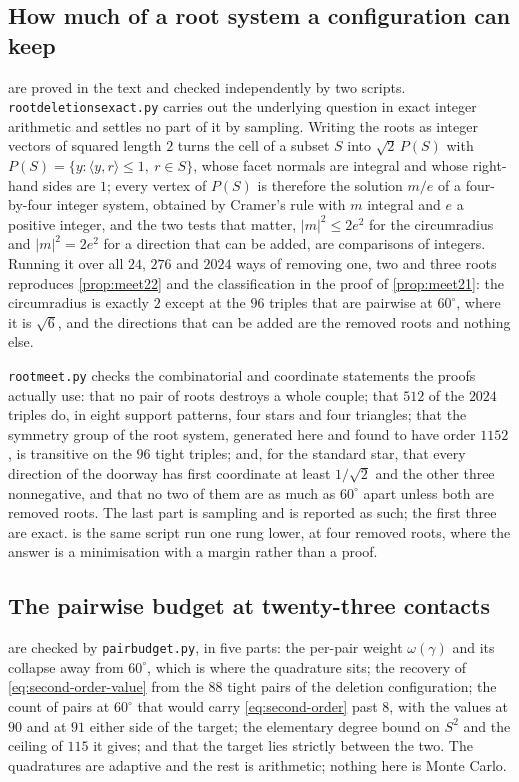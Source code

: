 \documentclass[11pt,reqno]{amsart}
\renewcommand{\_}{\origunderscore\allowbreak}
\numberwithin{equation}{section}
\theoremstyle{plain}
\theoremstyle{definition}
\theoremstyle{remark}
\begin{document}
\subsection*{How much of a root system a configuration can keep}

 are proved in the text and checked
independently by two scripts. \texttt{root\_deletions\_exact.py} carries
out the underlying question in exact integer arithmetic and settles no
part of it by sampling. Writing the roots as integer vectors of squared
length $2$ turns the cell of a subset $S$ into $\sqrt2\,P(S)$ with
$P(S)=\{y:\langle y,r\rangle\le1,\ r\in S\}$, whose facet normals are
integral and whose right-hand sides are $1$; every vertex of $P(S)$ is
therefore the solution $m/e$ of a four-by-four integer system, obtained
by Cramer's rule with $m$ integral and $e$ a positive integer, and the
two tests that matter, $|m|^2\le2e^2$ for the circumradius and
$|m|^2=2e^2$ for a direction that can be added, are comparisons of
integers. Running it over all $24$, $276$ and $2024$ ways of removing
one, two and three roots reproduces \cref{prop:meet22} and the
classification in the proof of \cref{prop:meet21}: the circumradius is
exactly $2$ except at the $96$ triples that are pairwise at $60^\circ$,
where it is $\sqrt6$, and the directions that can be added are the
removed roots and nothing else.

\texttt{root\_meet.py} checks the combinatorial and coordinate
statements the proofs actually use: that no pair of roots destroys a
whole couple; that $512$ of the $2024$ triples do, in eight support
patterns, four stars and four triangles; that the symmetry group of the
root system, generated here and found to have order $1152$, is
transitive on the $96$ tight triples; and, for the standard star, that
every direction of the doorway has first coordinate at least $1/\sqrt2$
and the other three nonnegative, and that no two of them are as much as
$60^\circ$ apart unless both are removed roots. The last part is
sampling and is reported as such; the first three are exact.
 is the same script run one rung lower, at four
removed roots, where the answer is a minimisation with a margin rather
than a proof.

\subsection*{The pairwise budget at twenty-three contacts}

 are checked by
\texttt{pair\_budget.py}, in five parts: the per-pair weight
$\omega(\gamma)$ and its collapse away from $60^\circ$, which is where
the quadrature sits; the recovery of \eqref{eq:second-order-value} from
the $88$ tight pairs of the deletion configuration; the count of pairs
at $60^\circ$ that would carry \eqref{eq:second-order} past $8$, with
the values at $90$ and at $91$ either side of the target; the
elementary degree bound on $S^2$ and the ceiling of $115$ it gives; and
that the target lies strictly between the two. The quadratures are
adaptive and the rest is arithmetic; nothing here is Monte Carlo.
\end{document}

